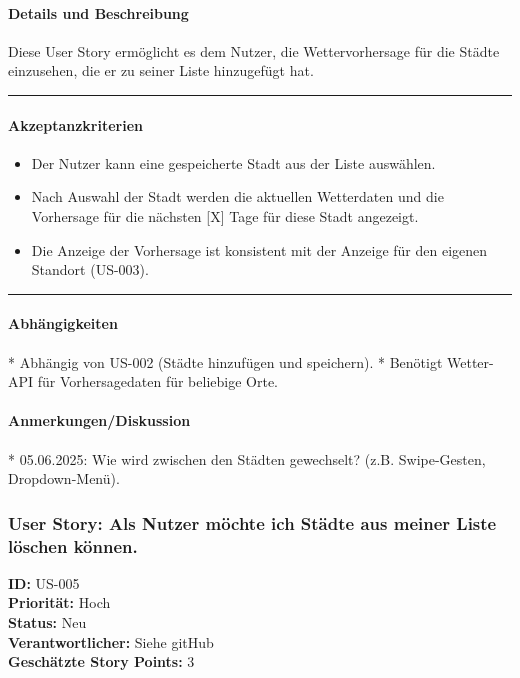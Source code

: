 \documentclass{article}
\begin{document}
\vspace{1em}

\paragraph{Details und Beschreibung}
Diese User Story ermöglicht es dem Nutzer, die Wettervorhersage für die Städte einzusehen, die er zu seiner Liste hinzugefügt hat.

\vspace{0.5em}
\hrule

\paragraph{Akzeptanzkriterien}
\begin{itemize}
    \item Der Nutzer kann eine gespeicherte Stadt aus der Liste auswählen.
    \item Nach Auswahl der Stadt werden die aktuellen Wetterdaten und die Vorhersage für die nächsten [X] Tage für diese Stadt angezeigt.
    \item Die Anzeige der Vorhersage ist konsistent mit der Anzeige für den eigenen Standort (US-003).
\end{itemize}

\vspace{0.5em}
\hrule

\paragraph{Abhängigkeiten}
* Abhängig von US-002 (Städte hinzufügen und speichern).
* Benötigt Wetter-API für Vorhersagedaten für beliebige Orte.

\paragraph{Anmerkungen/Diskussion}
* 05.06.2025: Wie wird zwischen den Städten gewechselt? (z.B. Swipe-Gesten, Dropdown-Menü).

\clearpage

\subsubsection{User Story: Als Nutzer möchte ich Städte aus meiner Liste löschen können.}
\textcolor{storyblue}{\textbf{ID:}} US-005 \\
\textcolor{storyblue}{\textbf{Priorität:}} Hoch \\
\textcolor{storyblue}{\textbf{Status:}} Neu \\
\textcolor{storyblue}{\textbf{Verantwortlicher:}} Siehe gitHub \\
\textcolor{storyblue}{\textbf{Geschätzte Story Points:}} 3
\end{document}
